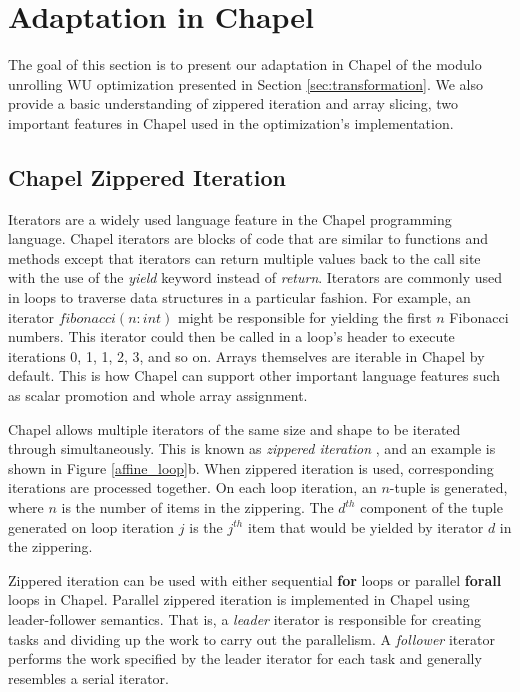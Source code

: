 \section{Adaptation in Chapel}\label{sec:adaptation_in_chapel}


The goal of this section is to present our adaptation in Chapel of the modulo unrolling WU optimization presented in Section \ref{sec:transformation}. We also provide a basic understanding of zippered iteration and array slicing, two important features in Chapel used in the optimization's implementation. 

\subsection{Chapel Zippered Iteration}\label{sec:zippered_iteration}

Iterators are a widely used language feature in the Chapel programming language. Chapel iterators are blocks of code that are similar to functions and methods except that iterators can return multiple values back to the call site with the use of the \textit{yield} keyword instead of \textit{return}. Iterators are commonly used in loops to traverse data structures in a particular fashion. For example, an iterator $fibonacci(n: int)$ might be responsible for yielding the first $n$ Fibonacci numbers. This iterator could then be called in a loop's header to execute iterations 0, 1, 1, 2, 3, and so on. Arrays themselves are iterable in Chapel by default. This is how Chapel can support other important language features such as scalar promotion and whole array assignment. 

Chapel allows multiple iterators of the same size and shape to be iterated through simultaneously. This is known as \textit{zippered iteration} \cite{chamberlain2011user}, and an example is shown in Figure \ref{affine_loop}b. When zippered iteration is used, corresponding iterations are processed together. On each loop iteration, an $n$-tuple is generated, where $n$ is the number of items in the zippering. The $d^{th}$ component of the tuple generated on loop iteration $j$ is the $j^{th}$ item that would be yielded by iterator $d$ in the zippering. 

Zippered iteration can be used with either sequential \textbf{for} loops or parallel \textbf{forall} loops in Chapel. Parallel zippered iteration is implemented in Chapel using leader-follower semantics. That is, a \textit{leader} iterator is responsible for creating tasks and dividing up the work to carry out the parallelism. A \textit{follower} iterator performs the work specified by the leader iterator for each task and generally resembles a serial iterator. 

